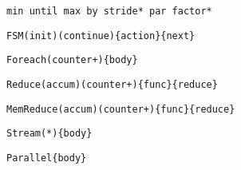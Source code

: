 \pagebreak

\begin{table*}
\vspace{-3cm}
\centering
\small

\newsavebox{\counterx}
\begin{lrbox}{\counterx}
\begin{lstlisting}[language=SpatialTable]
min until max by stride* par factor*
\end{lstlisting}
\end{lrbox}

\newsavebox{\fsmSignature}
\begin{lrbox}{\fsmSignature}
\begin{lstlisting}[language=SpatialTable]
FSM(init)(continue){action}{next}
\end{lstlisting}
\end{lrbox}

\newsavebox{\foreachSignature}
\begin{lrbox}{\foreachSignature}
\begin{lstlisting}[language=SpatialTable]
Foreach(counter+){body}
\end{lstlisting}
\end{lrbox}

\newsavebox{\reduceSignature}
\begin{lrbox}{\reduceSignature}
\begin{lstlisting}[language=SpatialTable]
Reduce(accum)(counter+){func}{reduce}
\end{lstlisting}
\end{lrbox}

\newsavebox{\memreduceSignature}
\begin{lrbox}{\memreduceSignature}
\begin{lstlisting}[language=SpatialTable]
MemReduce(accum)(counter+){func}{reduce}
\end{lstlisting}
\end{lrbox}

\newsavebox{\streamStar}
\begin{lrbox}{\streamStar}
\begin{lstlisting}[language=SpatialTable]
Stream(*){body}
\end{lstlisting}
\end{lrbox}

\newsavebox{\parallelSignature}
\begin{lrbox}{\parallelSignature}
\begin{lstlisting}[language=SpatialTable]
Parallel{body}
\end{lstlisting}
\end{lrbox}


\end{table*}
